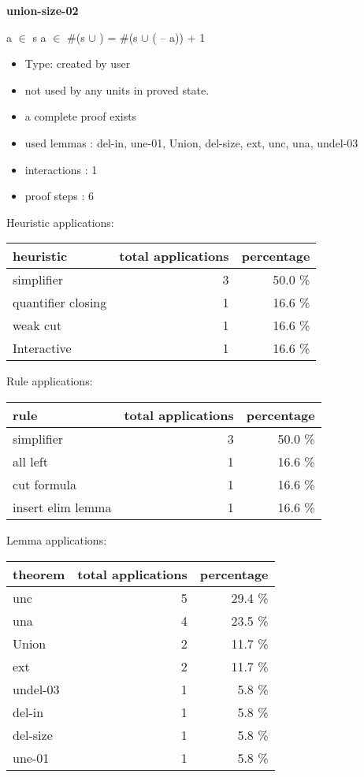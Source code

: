 \documentclass[a4paper]{article}
\begin{document}
{\LARGE\bf union-size-02}\label{lemma-union-size-02}

\medskip

 \Fol \Not a $\in$ s \And a $\in$  \Imp \#(s $\cup$ ) = \#(s $\cup$ ( -- a)) + 1

\begin{itemize}

\item Type: created by user

\item not used by any units in proved state.
\item       a complete proof exists
\item       used lemmas  : del-in, une-01, Union, del-size, ext, unc, una, undel-03
\item       interactions : 1
\item       proof steps  : 6
\end{itemize}

\medskip


Heuristic applications:

\begin{supertabular}{l|r|r}
heuristic	& total applications & percentage \\ \hline
simplifier & 3 & 50.0 \% \\
quantifier closing & 1 & 16.6 \% \\
weak cut & 1 & 16.6 \% \\
Interactive & 1 & 16.6 \% \\

\end{supertabular}

Rule applications:

\begin{supertabular}{l|r|r}
rule	        & total applications & percentage \\ \hline
simplifier & 3 & 50.0 \% \\
all left & 1 & 16.6 \% \\
cut formula & 1 & 16.6 \% \\
insert elim lemma & 1 & 16.6 \% \\

\end{supertabular}

Lemma applications:

\begin{supertabular}{l|r|r}
theorem	        & total applications & percentage \\ \hline
unc & 5 & 29.4 \% \\
una & 4 & 23.5 \% \\
Union & 2 & 11.7 \% \\
ext & 2 & 11.7 \% \\
undel-03 & 1 & 5.8 \% \\
del-in & 1 & 5.8 \% \\
del-size & 1 & 5.8 \% \\
une-01 & 1 & 5.8 \% \\

\end{supertabular}
\pagebreak
\end{document}
